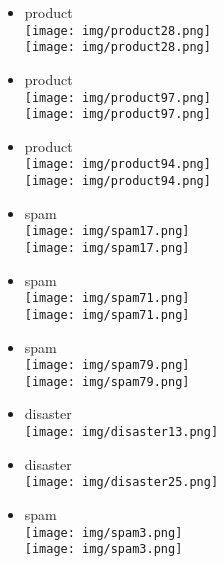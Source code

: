 \documentclass{article}
\theoremstyle{definition}
\theoremstyle{remark}
\begin{document}
\begin{landscape}
\begin{itemize}
    \item product\\\texttt{[image: img/product28.png]}\\
        \texttt{[image: img/product28.png]}
    \item product\\\texttt{[image: img/product97.png]}\\
        \texttt{[image: img/product97.png]}
    \item product\\\texttt{[image: img/product94.png]}\\
        \texttt{[image: img/product94.png]}
    \item spam\\\texttt{[image: img/spam17.png]}\\
        \texttt{[image: img/spam17.png]}
    \item spam\\\texttt{[image: img/spam71.png]}\\
        \texttt{[image: img/spam71.png]}
    \item spam\\\texttt{[image: img/spam79.png]}\\
        \texttt{[image: img/spam79.png]}
\end{itemize}

\newpage

\begin{itemize}
    \item disaster\\\texttt{[image: img/disaster13.png]}
    \item disaster\\\texttt{[image: img/disaster25.png]}
    \item spam\\\texttt{[image: img/spam3.png]}\\
        \texttt{[image: img/spam3.png]}
\end{itemize}


\end{landscape}
\end{document}
